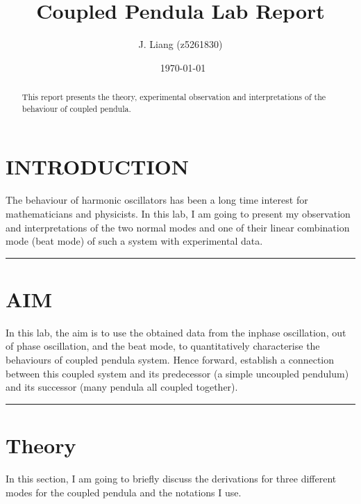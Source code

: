 \documentclass[aps,prl,reprint,10pt,amsmath,amssymb,superscriptaddress,a4paper]{revtex4-2}
\begin{document}
\title{Coupled Pendula Lab Report}
\author{J. Liang (z5261830)}
\date{\currenttime~\today}
\begin{abstract}
    This report presents the theory, experimental observation and interpretations of the behaviour of coupled pendula.
\end{abstract}

\maketitle
\section{INTRODUCTION}
The behaviour of harmonic oscillators has been a long time interest for mathematicians and physicists. In this lab, I am going to present my observation and interpretations of the two normal modes and one of their linear combination mode (beat mode) of such a system with experimental data.
\par\noindent\rule{\linewidth}{0.4pt}

\section{AIM}
In this lab, the aim is to use the obtained data from the inphase oscillation, out of phase oscillation, and the beat mode, to quantitatively characterise the behaviours of coupled pendula system. Hence forward, establish a connection between this coupled system and its predecessor (a simple uncoupled pendulum) and its successor (many pendula all coupled together).
\par\noindent\rule{\linewidth}{0.4pt}

\section{Theory}
In this section, I am going to briefly discuss the derivations for three different modes for the coupled pendula and the notations I use.
\end{document}
